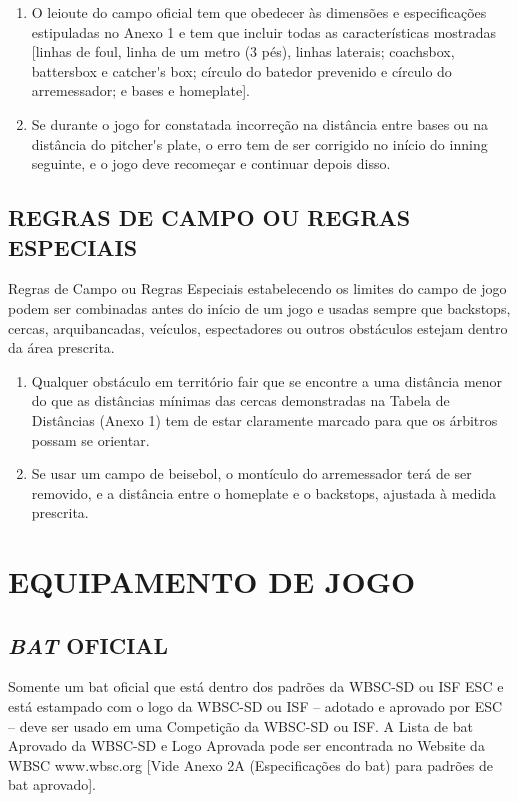 \begin{enumerate}[label=(\alph*)]
	\item O leioute do campo oficial tem que obedecer às dimensões e especificações estipuladas no Anexo 1 e tem que incluir todas as características mostradas	 [linhas de \gls{foul}, linha de um metro (3 pés), linhas laterais; \gls{coachsbox}, \gls{battersbox} e \gls{catcher's box}; círculo do batedor prevenido e círculo do arremessador;	 e bases e \gls{homeplate}].

	\item Se durante o jogo for constatada incorreção na distância entre bases ou na  distância do \gls{pitcher's plate}, o erro tem de ser corrigido no início do \gls{inning} seguinte, e o jogo deve recomeçar e continuar depois disso.
\end{enumerate}

\subsection{REGRAS DE CAMPO OU REGRAS ESPECIAIS}

Regras de Campo ou Regras Especiais estabelecendo os limites do campo de jogo podem ser combinadas antes do início de um jogo e usadas sempre que
\glspl{backstop}, cercas, arquibancadas, veículos, espectadores ou outros obstáculos estejam dentro da área prescrita.

\begin{enumerate}[label=(\alph*)]\item   Qualquer obstáculo em território \gls{fair} que se encontre a uma distância menor do que as distâncias mínimas das cercas demonstradas na Tabela de Distâncias (Anexo 1) tem de estar claramente marcado para que os árbitros possam se orientar.
	\item  Se usar um campo de beisebol, o montículo do arremessador terá de ser removido, e a distância entre o \gls{homeplate} e o \glspl{backstop}, ajustada à medida  prescrita.
\end{enumerate}


\section{EQUIPAMENTO DE JOGO}

\subsection{\textit{BAT} OFICIAL}
Somente um \gls{bat} oficial que está dentro dos padrões da WBSC-SD ou ISF \gls{ESC} e está estampado com o logo da WBSC-SD ou ISF -- adotado e aprovado por \gls{ESC} -- deve ser usado em uma Competição da WBSC-SD ou ISF. A Lista de \gls{bat} Aprovado da  WBSC-SD e Logo Aprovada pode ser encontrada no Website da WBSC www.wbsc.org [Vide Anexo 2A (Especificações do \gls{bat}) para padrões de \gls{bat} aprovado].

